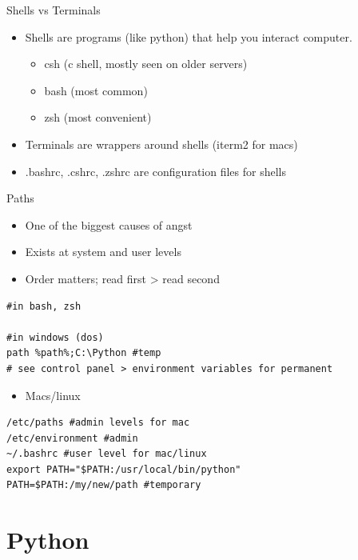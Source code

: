 \documentclass[presentation]{beamer}
\begin{document}
\begin{frame}[label=sec-3-0-10]{Shells vs Terminals}
\begin{itemize}
\item Shells are programs (like python) that help you interact computer.
\begin{itemize}
\item csh (c shell, mostly seen on older servers)
\item bash (most common)
\item zsh (most convenient)
\end{itemize}
\item Terminals are wrappers around shells (iterm2 for macs)
\item .bashrc, .cshrc, .zshrc are configuration files for shells
\end{itemize}
\end{frame}


\begin{frame}[fragile,label=sec-3-0-11]{Paths}
 \begin{itemize}
\item One of the biggest causes of angst
\item Exists at system and user levels
\item Order matters; read first > read second
\end{itemize}
\lstset{numbers=left,language=sh,label= ,caption= }
\begin{lstlisting}
#in bash, zsh 

#in windows (dos)
path %path%;C:\Python #temp
# see control panel > environment variables for permanent
\end{lstlisting}
\begin{itemize}
\item Macs/linux
\end{itemize}
\lstset{numbers=left,language=sh,label= ,caption= }
\begin{lstlisting}
/etc/paths #admin levels for mac
/etc/environment #admin
~/.bashrc #user level for mac/linux
export PATH="$PATH:/usr/local/bin/python"
PATH=$PATH:/my/new/path #temporary
\end{lstlisting}
\end{frame}


\section{Python}
\label{sec-4}
\end{document}
